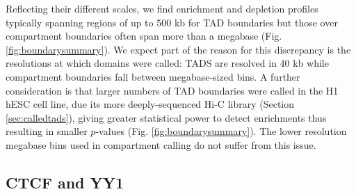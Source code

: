 \documentclass[a4paper,11pt,oneside]{book}
\begin{document}
Reflecting their different scales, we find enrichment and depletion profiles typically
spanning regions of up to 500 kb for TAD boundaries but those over compartment boundaries often span more than a megabase (Fig. \ref{fig:boundarysummary}). We expect part of the reason for this discrepancy is the resolutions at which domains were called: TADS are resolved in 40 kb while compartment boundaries fall between megabase-sized bins. A further consideration is that larger numbers of TAD boundaries were called in the H1 hESC cell line, due its more deeply-sequenced Hi-C library (Section \ref{sec:calledtads}), giving greater statistical power to detect enrichments thus resulting in smaller $p$-values (Fig. \ref{fig:boundarysummary}). The lower resolution megabase bins used in compartment calling do not suffer from this issue.



\subsection{CTCF and YY1}\label{sec:ctcfyy1}
\end{document}
